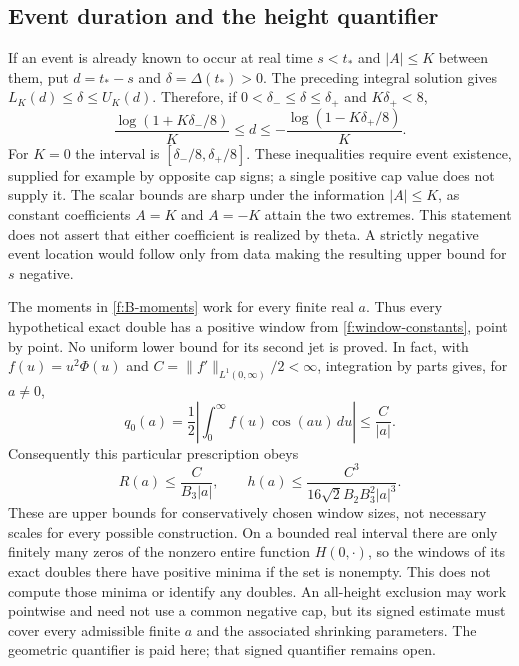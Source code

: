 \subsection{Event duration and the height quantifier}

If an event is already known to occur at real time $s<t_*$ and
$|A|\le K$ between them, put $d=t_*-s$ and
$\delta=\Delta(t_*)>0$.  The preceding integral solution gives
$L_K(d)\le\delta\le U_K(d)$.  Therefore, if
$0<\delta_-\le\delta\le\delta_+$ and $K\delta_+<8$,
\begin{equation}\label{f:duration}
 \frac{\log(1+K\delta_-/8)}K
 \le d\le
 -\frac{\log(1-K\delta_+/8)}K.
\end{equation}
For $K=0$ the interval is $[\delta_-/8,\delta_+/8]$.
These inequalities require event existence, supplied for example by
opposite cap signs; a single positive cap value does not supply it.
The scalar bounds are sharp under the information $|A|\le K$, as
constant coefficients $A=K$ and $A=-K$ attain the two extremes.
This statement does not assert that either coefficient is realized by
theta.  A strictly negative event location would follow only from
data making the resulting upper bound for $s$ negative.

The moments in \eqref{f:B-moments} work for every finite real $a$.
Thus every hypothetical exact double has a positive window from
\eqref{f:window-constants}, point by point.  No uniform lower bound
for its second jet is proved.  In fact, with
$f(u)=u^2\Phi(u)$ and $C=\|f'\|_{L^1(0,\infty)}/2<\infty$,
integration by parts gives, for $a\ne0$,
\[
 q_0(a)=\frac12\left|\int_0^\infty f(u)\cos(au)\,du\right|
         \le\frac C{|a|}.
\]
Consequently this particular prescription obeys
\begin{equation}\label{f:height-scale}
 R(a)\le\frac{C}{B_3|a|},\qquad
 h(a)\le\frac{C^3}{16\sqrt2 B_2B_3^2|a|^3}.
\end{equation}
These are upper bounds for conservatively chosen window sizes, not
necessary scales for every possible construction.  On a bounded
real interval there are only finitely many zeros of the nonzero entire
function $H(0,\cdot)$, so the windows of its exact doubles there have
positive minima if the set is nonempty.  This does not compute those
minima or identify any doubles.  An all-height exclusion may work
pointwise and need not use a common negative cap, but its signed
estimate must cover every admissible finite $a$ and the associated
shrinking parameters.  The geometric quantifier is paid here; that
signed quantifier remains open.
